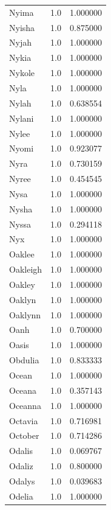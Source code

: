 \documentclass[
  letterpaper,
  DIV=11,
  numbers=noendperiod]{scrreprt}
\begin{document}
\begin{tabular}{lrr}
Nyima           &   1.0 &   1.000000 \\
Nyisha          &   1.0 &   0.875000 \\
Nyjah           &   1.0 &   1.000000 \\
Nykia           &   1.0 &   1.000000 \\
Nykole          &   1.0 &   1.000000 \\
Nyla            &   1.0 &   1.000000 \\
Nylah           &   1.0 &   0.638554 \\
Nylani          &   1.0 &   1.000000 \\
Nylee           &   1.0 &   1.000000 \\
Nyomi           &   1.0 &   0.923077 \\
Nyra            &   1.0 &   0.730159 \\
Nyree           &   1.0 &   0.454545 \\
Nysa            &   1.0 &   1.000000 \\
Nysha           &   1.0 &   1.000000 \\
Nyssa           &   1.0 &   0.294118 \\
Nyx             &   1.0 &   1.000000 \\
Oaklee          &   1.0 &   1.000000 \\
Oakleigh        &   1.0 &   1.000000 \\
Oakley          &   1.0 &   1.000000 \\
Oaklyn          &   1.0 &   1.000000 \\
Oaklynn         &   1.0 &   1.000000 \\
Oanh            &   1.0 &   0.700000 \\
Oasis           &   1.0 &   1.000000 \\
Obdulia         &   1.0 &   0.833333 \\
Ocean           &   1.0 &   1.000000 \\
Oceana          &   1.0 &   0.357143 \\
Oceanna         &   1.0 &   1.000000 \\
Octavia         &   1.0 &   0.716981 \\
October         &   1.0 &   0.714286 \\
Odalis          &   1.0 &   0.069767 \\
Odaliz          &   1.0 &   0.800000 \\
Odalys          &   1.0 &   0.039683 \\
Odelia          &   1.0 &   1.000000 \\

\end{tabular}
\end{document}
